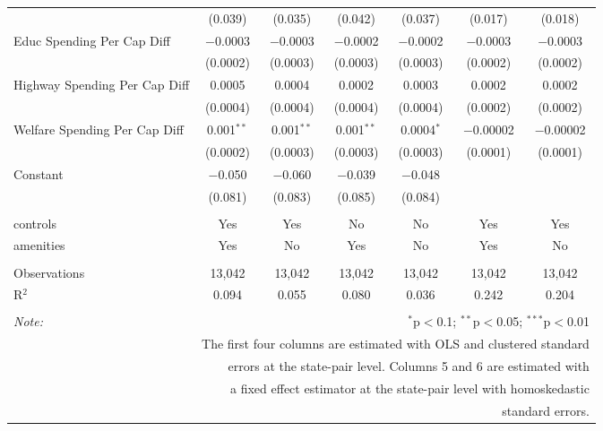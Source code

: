 \begin{table}[!htbp]
\begin{tabular}{@{\extracolsep{5pt}}lcccccc}
  & (0.039) & (0.035) & (0.042) & (0.037) & (0.017) & (0.018) \\ 
  Educ Spending Per Cap Diff & $-$0.0003 & $-$0.0003 & $-$0.0002 & $-$0.0002 & $-$0.0003 & $-$0.0003 \\ 
  & (0.0002) & (0.0003) & (0.0003) & (0.0003) & (0.0002) & (0.0002) \\ 
  Highway Spending Per Cap Diff & 0.0005 & 0.0004 & 0.0002 & 0.0003 & 0.0002 & 0.0002 \\ 
  & (0.0004) & (0.0004) & (0.0004) & (0.0004) & (0.0002) & (0.0002) \\ 
  Welfare Spending Per Cap Diff & 0.001$^{**}$ & 0.001$^{**}$ & 0.001$^{**}$ & 0.0004$^{*}$ & $-$0.00002 & $-$0.00002 \\ 
  & (0.0002) & (0.0003) & (0.0003) & (0.0003) & (0.0001) & (0.0001) \\ 
  Constant & $-$0.050 & $-$0.060 & $-$0.039 & $-$0.048 &  &  \\ 
  & (0.081) & (0.083) & (0.085) & (0.084) &  &  \\ 
 \hline \\[-1.8ex] 
controls & Yes & Yes & No & No & Yes & Yes \\ 
amenities & Yes & No & Yes & No & Yes & No \\ 
\hline \\[-1.8ex] 
Observations & 13,042 & 13,042 & 13,042 & 13,042 & 13,042 & 13,042 \\ 
R$^{2}$ & 0.094 & 0.055 & 0.080 & 0.036 & 0.242 & 0.204 \\ 
\hline 
\hline \\[-1.8ex] 
\textit{Note:}  & \multicolumn{6}{r}{$^{*}$p$<$0.1; $^{**}$p$<$0.05; $^{***}$p$<$0.01} \\ 
 & \multicolumn{6}{r}{The first four columns are estimated with OLS and clustered standard} \\ 
 & \multicolumn{6}{r}{ errors at the state-pair level. Columns 5 and 6 are estimated with} \\ 
 & \multicolumn{6}{r}{a fixed effect estimator at the state-pair level with homoskedastic} \\ 
 & \multicolumn{6}{r}{standard errors.} \\ 
\end{tabular} 
\end{table} 
